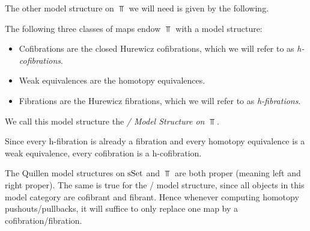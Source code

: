 The other model structure on $\Top$ we will need is given by the following.
\begin{prop}
    The following three classes of maps endow $\Top$ with a model structure:
    \begin{itemize}
        \item Cofibrations are the closed Hurewicz cofibrations, which we will refer to as \emph{h-cofibrations}.
        \item Weak equivalences are the homotopy equivalences.
        \item Fibrations are the Hurewicz fibrations, which we will refer to as \emph{h-fibrations}.
    \end{itemize}
    We call this model structure the \emph{\Strom/ Model Structure on $\Top$}.
    \begin{reference}
       \cite{Strom1972}
    \end{reference}
\end{prop}
\begin{remark}
    Since every h-fibration is already a fibration and every homotopy equivalence is a weak equivalence, every cofibration is a h-cofibration.
\end{remark}
\begin{remark}[Properness]
    The Quillen model structures on $\operatorname{sSet}$ and $\Top$ are both proper (meaning left and right proper).
    The same is true for the \Strom/ model structure, since all objects in this model category are cofibrant and fibrant.
    Hence whenever computing homotopy pushouts/pullbacks, it will suffice to only replace one map by a cofibration/fibration.
\end{remark}
